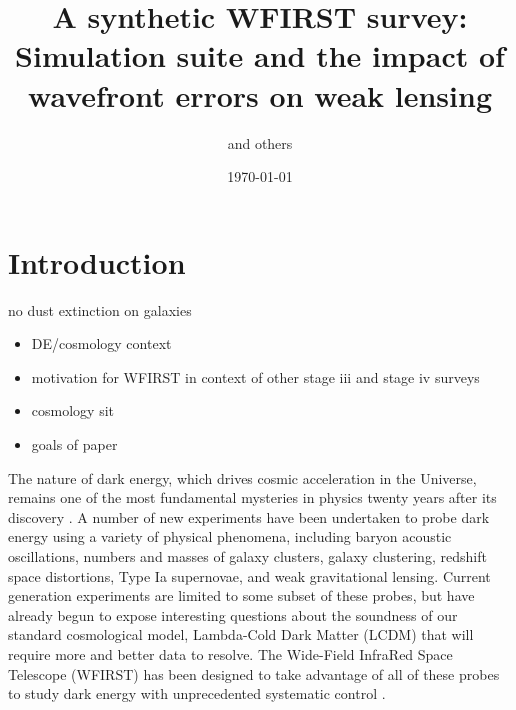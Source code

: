 \documentclass[aps,prd, amsmath,amssymb,superscriptaddress,showkeys,nofootinbib,reprint,preprintnumbers]{revtex4-1}
\begin{document}
\title{A synthetic WFIRST survey: Simulation suite and the impact of wavefront errors on weak lensing}

\author{and others}


\noaffiliation

\date{\today}

\label{firstpage}

\begin{abstract}
\end{abstract}

\keywords{}

\maketitle


\section{Introduction}\label{sec:intro}

no dust extinction on galaxies

\begin{itemize}
\item DE/cosmology context
\item motivation for WFIRST in context of other stage iii and stage iv surveys
\item cosmology sit
\item goals of paper
\end{itemize}


The nature of dark energy, which drives cosmic acceleration in the Universe, remains one of the most fundamental mysteries in physics twenty years after its discovery \cite{riess98,perlmutter99,detf,Frieman:2008sn,weinberg13}. 
A number of new experiments have been undertaken to probe dark energy using a variety of physical phenomena, including baryon acoustic oscillations, numbers and masses of galaxy clusters, galaxy clustering, redshift space distortions, Type Ia supernovae, and weak gravitational lensing. 
Current generation experiments are limited to some subset of these probes, but have already begun to expose interesting questions about the soundness of our standard cosmological model, Lambda-Cold Dark Matter (LCDM) that will require more and better data to resolve. 
The Wide-Field InfraRed Space Telescope (WFIRST) has been designed to take advantage of all of these probes to study dark energy with unprecedented systematic control \cite{2019BAAS...51c.341D,2019arXiv190205569A}.
\end{document}
